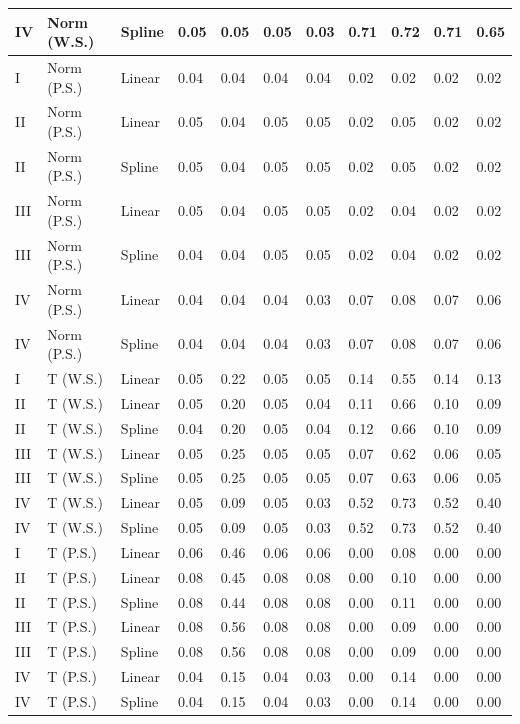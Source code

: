 \documentclass{article}\usepackage[]{graphicx}\usepackage[]{color}
\begin{document}
\begin{table}[ht]
\begin{tabular}{lll|llll|llll}
  IV & Norm (W.S.) & Spline & 0.05 & 0.05 & 0.05 & 0.03 & 0.71 & 0.72 & 0.71 & 0.65 \\ 
   \hline
I & Norm (P.S.) & Linear & 0.04 & 0.04 & 0.04 & 0.04 & 0.02 & 0.02 & 0.02 & 0.02 \\ 
  II & Norm (P.S.) & Linear & 0.05 & 0.04 & 0.05 & 0.05 & 0.02 & 0.05 & 0.02 & 0.02 \\ 
  II & Norm (P.S.) & Spline & 0.05 & 0.04 & 0.05 & 0.05 & 0.02 & 0.05 & 0.02 & 0.02 \\ 
  III & Norm (P.S.) & Linear & 0.05 & 0.04 & 0.05 & 0.05 & 0.02 & 0.04 & 0.02 & 0.02 \\ 
  III & Norm (P.S.) & Spline & 0.04 & 0.04 & 0.05 & 0.05 & 0.02 & 0.04 & 0.02 & 0.02 \\ 
  IV & Norm (P.S.) & Linear & 0.04 & 0.04 & 0.04 & 0.03 & 0.07 & 0.08 & 0.07 & 0.06 \\ 
  IV & Norm (P.S.) & Spline & 0.04 & 0.04 & 0.04 & 0.03 & 0.07 & 0.08 & 0.07 & 0.06 \\ 
   \hline
I & T (W.S.) & Linear & 0.05 & 0.22 & 0.05 & 0.05 & 0.14 & 0.55 & 0.14 & 0.13 \\ 
  II & T (W.S.) & Linear & 0.05 & 0.20 & 0.05 & 0.04 & 0.11 & 0.66 & 0.10 & 0.09 \\ 
  II & T (W.S.) & Spline & 0.04 & 0.20 & 0.05 & 0.04 & 0.12 & 0.66 & 0.10 & 0.09 \\ 
  III & T (W.S.) & Linear & 0.05 & 0.25 & 0.05 & 0.05 & 0.07 & 0.62 & 0.06 & 0.05 \\ 
  III & T (W.S.) & Spline & 0.05 & 0.25 & 0.05 & 0.05 & 0.07 & 0.63 & 0.06 & 0.05 \\ 
  IV & T (W.S.) & Linear & 0.05 & 0.09 & 0.05 & 0.03 & 0.52 & 0.73 & 0.52 & 0.40 \\ 
  IV & T (W.S.) & Spline & 0.05 & 0.09 & 0.05 & 0.03 & 0.52 & 0.73 & 0.52 & 0.40 \\ 
   \hline
I & T (P.S.) & Linear & 0.06 & 0.46 & 0.06 & 0.06 & 0.00 & 0.08 & 0.00 & 0.00 \\ 
  II & T (P.S.) & Linear & 0.08 & 0.45 & 0.08 & 0.08 & 0.00 & 0.10 & 0.00 & 0.00 \\ 
  II & T (P.S.) & Spline & 0.08 & 0.44 & 0.08 & 0.08 & 0.00 & 0.11 & 0.00 & 0.00 \\ 
  III & T (P.S.) & Linear & 0.08 & 0.56 & 0.08 & 0.08 & 0.00 & 0.09 & 0.00 & 0.00 \\ 
  III & T (P.S.) & Spline & 0.08 & 0.56 & 0.08 & 0.08 & 0.00 & 0.09 & 0.00 & 0.00 \\ 
  IV & T (P.S.) & Linear & 0.04 & 0.15 & 0.04 & 0.03 & 0.00 & 0.14 & 0.00 & 0.00 \\ 
  IV & T (P.S.) & Spline & 0.04 & 0.15 & 0.04 & 0.03 & 0.00 & 0.14 & 0.00 & 0.00 \\ 
   \hline
\end{tabular}
\end{table}
\end{document}
